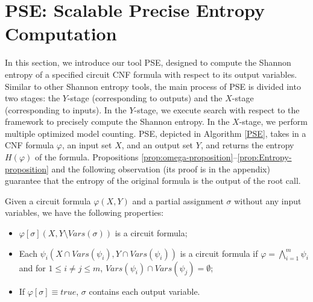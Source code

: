 \section{PSE: Scalable Precise Entropy Computation}
\label{sec:PSE}

In this section, we introduce our tool PSE, designed to compute the Shannon entropy of a specified circuit CNF formula with respect to its output variables.
Similar to other Shannon entropy tools, the main process of PSE is divided into two stages: the $Y$-stage (corresponding to outputs) and the $X$-stage (corresponding to inputs).
In the $Y$-stage, we execute search with respect to the \ADDAND framework to precisely compute the Shannon entropy.
In the $X$-stage, we perform multiple optimized model counting.
PSE, depicted in Algorithm \ref{PSE}, takes in a CNF formula $\varphi$, an input set $X$, and an output set $Y$, and returns the entropy $\mathit{H}(\varphi)$ of the formula.
Propositions \ref{prop:omega-proposition}--\ref{prop:Entropy-proposition} and the following observation (its proof is in the appendix) guarantee that the entropy of the original formula is the output of the root call.

\begin{observation}\label{prop:circuit-proposition}
	Given a circuit formula $\varphi(X, Y)$ and a partial assignment $\sigma$ without any input variables, we have the following properties:
	\begin{itemize}
		\item $\varphi[\sigma](X, Y \setminus \mathit{Vars}(\sigma))$ is a circuit formula;
		\item Each $\psi_i(X \cap \mathit{Vars}(\psi_i), Y \cap \mathit{Vars}(\psi_i))$ is a circuit formula if $\varphi = \bigwedge_{i = 1}^m\psi_i$ and for  
		$1 \le i \ne j  \le m$, $\mathit{Vars}(\psi_i) \cap \mathit{Vars}(\psi_j) = \emptyset$;
		\item If $\varphi[\sigma] \equiv \mathit{true}$, $\sigma$  contains each output variable.
	\end{itemize}
	
\end{observation}



